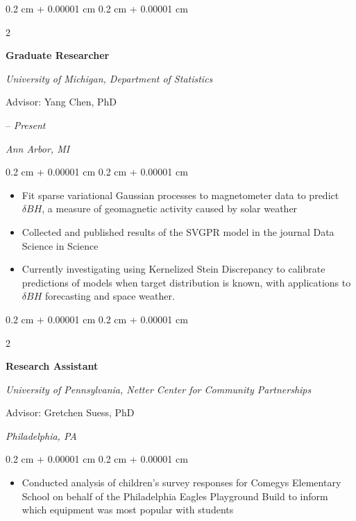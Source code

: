 \documentclass[11pt, letterpaper]{article}
\newenvironment{highlights}{
    \begin{itemize}[
        topsep=0.10 cm,
        parsep=0.10 cm,
        partopsep=0pt,
        itemsep=0pt,
        leftmargin=0.4 cm + 10pt
    ]
}{
    \end{itemize}
} %
\newenvironment{onecolentry}{
    \begin{adjustwidth}{
        0.2 cm + 0.00001 cm
    }{
        0.2 cm + 0.00001 cm
    }
}{
    \end{adjustwidth}
} %
\newenvironment{twocolentry}[2][]{
    \onecolentry
    \def\secondColumn{#2}
    \setcolumnwidth{\fill, 4.5 cm}
    \begin{paracol}{2}
}{
    \switchcolumn \raggedleft \secondColumn
    \end{paracol}
    \endonecolentry
} %
\begin{document}
\vspace{0.2 cm}
\begin{twocolentry}{2022 – \textit{Present}

        \textit{Ann Arbor, MI}
    }
    \textbf{Graduate Researcher}

    \textit{University of Michigan, Department of Statistics}

    Advisor: Yang Chen, PhD
\end{twocolentry}

\vspace{0.05 cm}
\begin{onecolentry}
    \begin{highlights}
        \item Fit sparse variational Gaussian processes to magnetometer data to predict $\delta BH$, a measure of geomagnetic activity caused by solar weather
        \item Collected and published results of the SVGPR model in the journal Data Science in Science
        \item Currently investigating using Kernelized Stein Discrepancy to calibrate predictions of models when target distribution is known, with applications to $\delta BH$ forecasting and space weather.
    \end{highlights}
\end{onecolentry}


\vspace{0.2 cm}
\begin{twocolentry}{2014

        \textit{Philadelphia, PA}
    }
    \textbf{Research Assistant}

    \textit{University of Pennsylvania, Netter Center for Community Partnerships}

    Advisor: Gretchen Suess, PhD
\end{twocolentry}

\vspace{0.05 cm}
\begin{onecolentry}
    \begin{highlights}
        \item Conducted analysis of children's survey responses for Comegys Elementary School on behalf of the Philadelphia Eagles Playground Build to inform which equipment was most popular with students
    \end{highlights}
\end{onecolentry}

\vspace{0.2cm}
\end{document}
